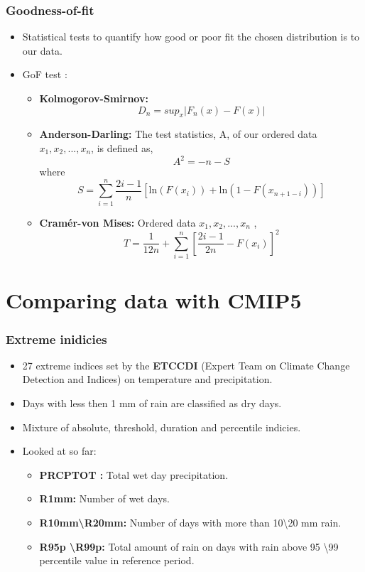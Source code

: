\documentclass{beamer}
\begin{document}
\begin{frame}
\frametitle{Goodness-of-fit}
\begin{itemize}
	\item Statistical tests to quantify how good or poor fit the chosen distribution is to our data.
	\item GoF test :
	\begin{itemize}
		\item \textbf{Kolmogorov-Smirnov:} 
		\begin{equation*}
		D_n = sup_x |F_n(x) - F(x)|
		\end{equation*}
		\item \textbf{Anderson-Darling:} The test statistics, A, of our ordered data ${x_1, x_2, ..., x_n}$, is defined as,
		\begin{equation*}
		A^2 = -n - S
		\end{equation*}
		where
		\begin{equation*}
		S = \sum_{i=1}^n\frac{2i -1}{n}[\text{ln}(F(x_i)) + \text{ln}(1 - F(x_{n+1-i}) )]
		\end{equation*}
		\item \textbf{Cram\'{e}r-von Mises:} Ordered data ${x_1, x_2,...,x_n}$ ,
		\begin{equation*}
		T = \frac{1}{12n} + \sum_{i=1}^{n}\left[\frac{2i-1}{2n} - F(x_i)\right]^2
		\end{equation*}
	\end{itemize}
\end{itemize}
\end{frame}

\section{Comparing data with CMIP5}

\begin{frame}
\frametitle{Extreme inidicies}
\begin{itemize}
	\item 27 extreme indices set by the \textbf{ETCCDI} (Expert Team on Climate Change Detection and Indices) on temperature and precipitation.
	\item Days with less then 1 mm of rain are classified as dry days.
	\item Mixture of absolute, threshold, duration and percentile indicies. 
	\item Looked at so far:
	\begin{itemize}
		\item \textbf{PRCPTOT :} Total wet day precipitation.
		\item \textbf{R1mm: } Number of wet days.
		\item \textbf{R10mm\textbackslash R20mm:} Number of days with more than 10\textbackslash 20 mm rain.
		\item \textbf{R95p \textbackslash R99p:} Total amount of rain on days with rain above 95 \textbackslash 99 percentile value in reference period.
	\end{itemize}
\end{itemize}
\end{frame}
\end{document}
